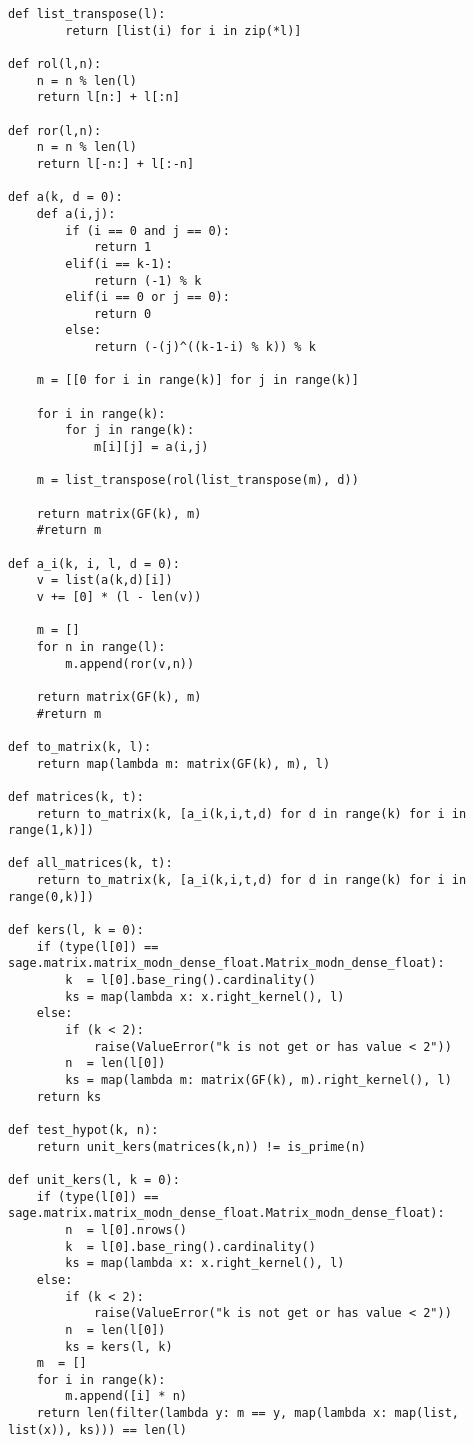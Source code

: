 \documentclass[bibliography=totoc, a4paper, 14pt]{extarticle}
\begin{document}
\begin{footnotesize}
\begin{verbatim}
def list_transpose(l):
        return [list(i) for i in zip(*l)]

def rol(l,n):
    n = n % len(l)
    return l[n:] + l[:n]

def ror(l,n):
    n = n % len(l)
    return l[-n:] + l[:-n]

def a(k, d = 0):
    def a(i,j):
        if (i == 0 and j == 0):
            return 1
        elif(i == k-1):
            return (-1) % k
        elif(i == 0 or j == 0):
            return 0
        else:
            return (-(j)^((k-1-i) % k)) % k
    
    m = [[0 for i in range(k)] for j in range(k)]
    
    for i in range(k):
        for j in range(k):
            m[i][j] = a(i,j)
    
    m = list_transpose(rol(list_transpose(m), d))
    
    return matrix(GF(k), m)
    #return m

def a_i(k, i, l, d = 0):
    v = list(a(k,d)[i])
    v += [0] * (l - len(v))
    
    m = []
    for n in range(l):
        m.append(ror(v,n))
    
    return matrix(GF(k), m)
    #return m

def to_matrix(k, l):
    return map(lambda m: matrix(GF(k), m), l)

def matrices(k, t):
    return to_matrix(k, [a_i(k,i,t,d) for d in range(k) for i in range(1,k)])

def all_matrices(k, t):
    return to_matrix(k, [a_i(k,i,t,d) for d in range(k) for i in range(0,k)])

def kers(l, k = 0):
    if (type(l[0]) == sage.matrix.matrix_modn_dense_float.Matrix_modn_dense_float):
        k  = l[0].base_ring().cardinality()
        ks = map(lambda x: x.right_kernel(), l)
    else:
        if (k < 2):
            raise(ValueError("k is not get or has value < 2"))
        n  = len(l[0])
        ks = map(lambda m: matrix(GF(k), m).right_kernel(), l)
    return ks

def test_hypot(k, n):
    return unit_kers(matrices(k,n)) != is_prime(n)

def unit_kers(l, k = 0):
    if (type(l[0]) == sage.matrix.matrix_modn_dense_float.Matrix_modn_dense_float):
        n  = l[0].nrows()
        k  = l[0].base_ring().cardinality()
        ks = map(lambda x: x.right_kernel(), l)
    else:
        if (k < 2):
            raise(ValueError("k is not get or has value < 2"))
        n  = len(l[0])
        ks = kers(l, k)
    m  = []
    for i in range(k):
        m.append([i] * n)
    return len(filter(lambda y: m == y, map(lambda x: map(list, list(x)), ks))) == len(l)
\end{verbatim}
\end{footnotesize}
\end{document}
